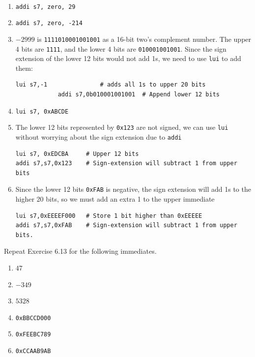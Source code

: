 \documentclass[12pt]{article}
\newenvironment{ex}[2][Exercise]{\begin{trivlist}
		\item[\hskip \labelsep {\bfseries #1}\hskip \labelsep {\bfseries #2.}]}{\end{trivlist}}
\newenvironment{sol}[1][Solution]{\begin{trivlist}
		\item[\hskip \labelsep {\bfseries #1:}]}{\end{trivlist}}
\begin{document}
\begin{sol}
	\
	\begin{enumerate}[label=(\alph*)]
		\item \texttt{addi s7, zero, 29}
		\item \texttt{addi s7, zero, -214}
		\item $-2999$ is \texttt{1111010001001001} as a 16-bit two's
		complement number. The upper 4 bits are \texttt{1111}, and
		the lower 4 bits are \texttt{010001001001}. Since the sign
		extension of the lower 12 bits would not add 1s, we need to use
		\texttt{lui} to add them:
		\begin{lstlisting}[language={}]
			lui	s7,-1				# adds all 1s to upper 20 bits
			addi s7,0b010001001001	# Append lower 12 bits
		\end{lstlisting}
		\item \texttt{lui s7, 0xABCDE}
		\item The lower 12 bits represented by \texttt{0x123} are not signed,
		we can use \texttt{lui} without worrying about the sign extension
		due to \texttt{addi}
		\
		\begin{lstlisting}[language={}]
lui s7, 0xEDCBA		# Upper 12 bits
addi s7,s7,0x123	# Sign-extension will subtract 1 from upper bits
		\end{lstlisting}
		\item Since the lower 12 bits \texttt{0xFAB} is negative, the
		sign extension will add 1s to the higher 20 bits, so we must
		add an extra 1 to the upper immediate
		\
		\begin{lstlisting}[language={}]
lui s7,0xEEEEF000	# Store 1 bit higher than 0xEEEEE
addi s7,s7,0xFAB	# Sign-extension will subtract 1 from upper bits.
		\end{lstlisting}
	\end{enumerate}
\end{sol}

\begin{ex}{6.14}
	Repeat Exercise 6.13 for the following immediates.
	\begin{enumerate}[label=(\alph*)]
		\item $47$
		\item $-349$
		\item $5328$
		\item \texttt{0xBBCCD000}
		\item \texttt{0xFEEBC789}
		\item \texttt{0xCCAAB9AB}
	\end{enumerate}
\end{ex}
\end{document}
